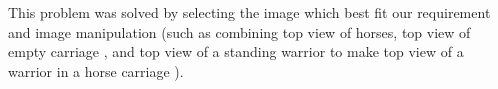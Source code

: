 \begin{enumerate}
	This problem was solved by selecting the image which best fit our requirement and image manipulation (such as combining top view of horses, top view of empty carriage , and top view of a standing warrior to make top view of a warrior in a horse carriage ). 
		
\end{enumerate}




\newpage